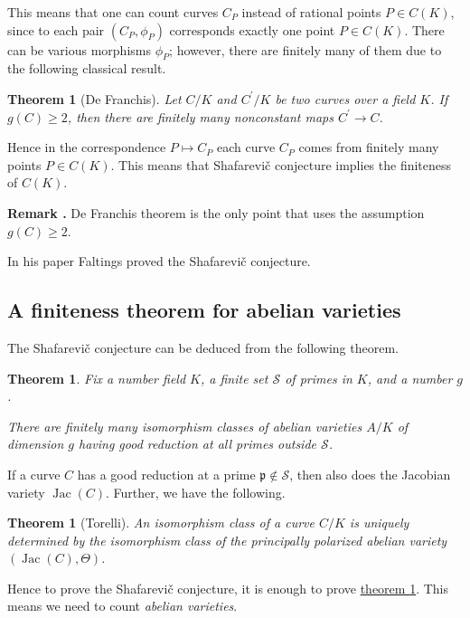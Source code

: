 \documentclass{article}
\newcommand{\refref}[2]{\hyperref[#2]{#1 \ref*{#2}}}
\newtheorem{theorem}[proposition]{Theorem}
\theoremstyle{definition}
\DeclareMathOperator{\Jac}{Jac}
\newenvironment{remark}
{ \begin{shaded}\begingroup\small\noindent\refstepcounter{proposition}\textbf{Remark \theproposition.} }
{ \endgroup\end{shaded} }
\begin{document}
This means that one can count curves $C_P$ instead of rational points
$P \in C (K)$, since to each pair $(C_P, \phi_P)$ corresponds exactly one point
$P \in C (K)$. There can be various morphisms $\phi_P$; however, there are
finitely many of them due to the following classical result.

\begin{theorem}[De Franchis]
  Let $C/K$ and $C^\prime/K$ be two curves over a field $K$. If $g (C) \ge 2$,
  then there are finitely many nonconstant maps $C^\prime \to C$.
\end{theorem}

Hence in the correspondence $P \mapsto C_P$ each curve $C_P$ comes from finitely
many points $P \in C (K)$. This means that Shafarevi\v{c} conjecture implies the
finiteness of $C (K)$.

\begin{remark}
  De Franchis theorem is the only point that uses the assumption $g (C) \ge 2$.
\end{remark}

In his paper Faltings proved the Shafarevi\v{c} conjecture.

\subsection*{A finiteness theorem for abelian varieties}

The Shafarevi\v{c} conjecture can be deduced from the following theorem.

\begin{theorem}
  \label{theorem:finiteness-for-abelian-varieties}
  Fix a number field $K$, a finite set $\mathcal{S}$ of primes in $K$, and a
  number $g$.

  There are finitely many isomorphism classes of abelian varieties $A/K$ of
  dimension $g$ having good reduction at all primes outside $\mathcal{S}$.
\end{theorem}

If a curve $C$ has a good reduction at a prime
$\mathfrak{p} \notin \mathcal{S}$, then also does the Jacobian variety
$\Jac (C)$. Further, we have the following.

\begin{theorem}[Torelli]
  An isomorphism class of a curve $C/K$ is uniquely determined by the
  isomorphism class of the principally polarized abelian variety
  $(\Jac (C), \Theta)$.
\end{theorem}

Hence to prove the Shafarevi\v{c} conjecture, it is enough to prove
\refref{theorem}{theorem:finiteness-for-abelian-varieties}. This means we need
to count \emph{abelian varieties}.
\end{document}
